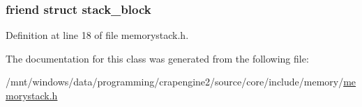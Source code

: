 \subsubsection[{stack\+\_\+block}]{\setlength{\rightskip}{0pt plus 5cm}friend struct {\bf stack\+\_\+block}\hspace{0.3cm}{\ttfamily [friend]}}\label{classcrap_1_1memory__stack_abdb549c24c617910dfa86bc8d8412eb3}


Definition at line 18 of file memorystack.\+h.



The documentation for this class was generated from the following file\+:\begin{DoxyCompactItemize}
\item 
/mnt/windows/data/programming/crapengine2/source/core/include/memory/\hyperlink{memorystack_8h}{memorystack.\+h}\end{DoxyCompactItemize}
